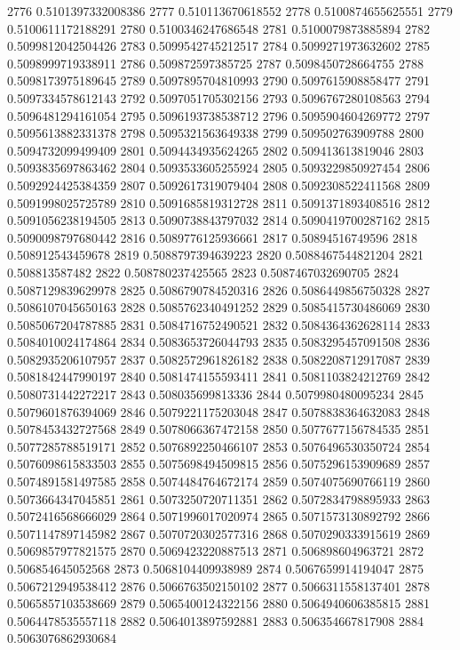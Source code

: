 2776 0.5101397332008386
2777 0.510113670618552
2778 0.5100874655625551
2779 0.5100611172188291
2780 0.5100346247686548
2781 0.5100079873885894
2782 0.5099812042504426
2783 0.5099542745212517
2784 0.5099271973632602
2785 0.5098999719338911
2786 0.509872597385725
2787 0.5098450728664755
2788 0.5098173975189645
2789 0.5097895704810993
2790 0.5097615908858477
2791 0.5097334578612143
2792 0.5097051705302156
2793 0.5096767280108563
2794 0.5096481294161054
2795 0.5096193738538712
2796 0.5095904604269772
2797 0.5095613882331378
2798 0.5095321563649338
2799 0.509502763909788
2800 0.5094732099499409
2801 0.5094434935624265
2802 0.509413613819046
2803 0.5093835697863462
2804 0.5093533605255924
2805 0.5093229850927454
2806 0.5092924425384359
2807 0.5092617319079404
2808 0.5092308522411568
2809 0.5091998025725789
2810 0.5091685819312728
2811 0.5091371893408516
2812 0.5091056238194505
2813 0.5090738843797032
2814 0.5090419700287162
2815 0.5090098797680442
2816 0.5089776125936661
2817 0.50894516749596
2818 0.508912543459678
2819 0.5088797394639223
2820 0.5088467544821204
2821 0.508813587482
2822 0.508780237425565
2823 0.5087467032690705
2824 0.5087129839629978
2825 0.5086790784520316
2826 0.5086449856750328
2827 0.5086107045650163
2828 0.5085762340491252
2829 0.5085415730486069
2830 0.5085067204787885
2831 0.5084716752490521
2832 0.5084364362628114
2833 0.5084010024174864
2834 0.5083653726044793
2835 0.5083295457091508
2836 0.5082935206107957
2837 0.5082572961826182
2838 0.5082208712917087
2839 0.5081842447990197
2840 0.5081474155593411
2841 0.5081103824212769
2842 0.5080731442272217
2843 0.508035699813336
2844 0.5079980480095234
2845 0.5079601876394069
2846 0.5079221175203048
2847 0.5078838364632083
2848 0.5078453432727568
2849 0.5078066367472158
2850 0.5077677156784535
2851 0.5077285788519171
2852 0.5076892250466107
2853 0.5076496530350724
2854 0.5076098615833503
2855 0.5075698494509815
2856 0.5075296153909689
2857 0.5074891581497585
2858 0.5074484764672174
2859 0.5074075690766119
2860 0.5073664347045851
2861 0.5073250720711351
2862 0.5072834798895933
2863 0.5072416568666029
2864 0.5071996017020974
2865 0.5071573130892792
2866 0.5071147897145982
2867 0.5070720302577316
2868 0.5070290333915619
2869 0.5069857977821575
2870 0.5069423220887513
2871 0.506898604963721
2872 0.506854645052568
2873 0.5068104409938989
2874 0.5067659914194047
2875 0.5067212949538412
2876 0.5066763502150102
2877 0.5066311558137401
2878 0.5065857103538669
2879 0.5065400124322156
2880 0.5064940606385815
2881 0.5064478535557118
2882 0.5064013897592881
2883 0.506354667817908
2884 0.5063076862930684
